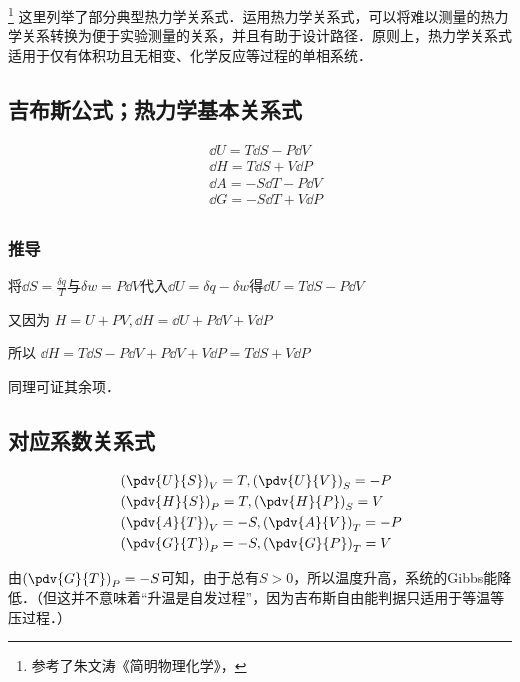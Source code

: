 \footnote{参考了朱文涛《简明物理化学》，}
这里列举了部分典型热力学关系式．运用热力学关系式，可以将难以测量的热力学关系转换为便于实验测量的关系，并且有助于设计路径．原则上，热力学关系式适用于仅有体积功且无相变、化学反应等过程的单相系统．

\subsection{吉布斯公式；热力学基本关系式}
\begin{align}\label{MWRel_eq4}
&\dd U = T \dd S - P \dd V\\
&\dd H = T \dd S + V \dd P\\
&\dd A = -S \dd T - P \dd V\\
&\dd G = -S \dd T +V \dd P\\
\end{align}

\subsubsection{推导}
将$\dd S = \frac{\delta q}{T}$与$\delta w = P\dd V$代入$\dd U=\delta q-\delta w$得$\dd U = T \dd S - P \dd V$

又因为 $H=U+PV, \dd H = \dd U + P \dd V + V \dd P$

所以 $\dd H = T \dd S - P \dd V+ P \dd V + V \dd P = T \dd S + V \dd P$

同理可证其余项．

\subsection{对应系数关系式}
\begin{align}
&\left(\pdv{U}{S}\right)_V=T, \left(\pdv{U}{V}\right)_S=-P
\\
&\left(\pdv{H}{S}\right)_P=T, \left(\pdv{H}{P}\right)_S=V
\\
&\left(\pdv{A}{T}\right)_V=-S, \left(\pdv{A}{V}\right)_T=-P
\\
&\left(\pdv{G}{T}\right)_P=-S, \left(\pdv{G}{P}\right)_T=V
\end{align}

由$\left(\pdv{G}{T}\right)_P=-S$可知，由于总有$S>0$，所以温度升高，系统的Gibbs能降低．（但这并不意味着“升温是自发过程”，因为吉布斯自由能判据只适用于等温等压过程．）

